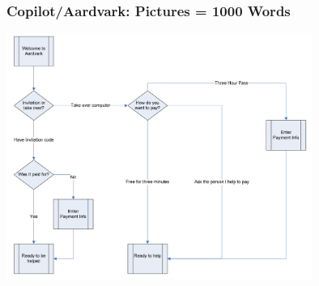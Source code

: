 \begin{frame}
\frametitle{Copilot/Aardvark: Pictures = 1000 Words}


\begin{center}
	\includegraphics[width=0.75\textwidth]{images/aardvarksite.png}
\end{center}


\end{frame}




